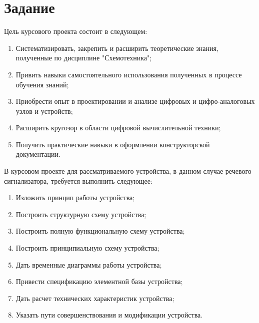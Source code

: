 \section{Задание}
Цель курсового проекта состоит в следующем: 
\begin{enumerate}
	\item Систематизировать, закрепить и расширить теоретические знания, полученные по дисциплине "Схемотехника"; 
	\item Привить навыки самостоятельного использования полученных в процессе обучения знаний; 
	\item Приобрести опыт в проектировании и анализе цифровых и цифро-аналоговых узлов и устройств; 
	\item Расширить кругозор в области цифровой вычислительной техники; 
	\item Получить практические навыки в оформлении конструкторской документации. 
\end{enumerate}

В курсовом проекте для рассматриваемого устройства, в данном случае речевого сигнализатора, требуется выполнить следующее: 

\begin{enumerate}
		\item Изложить принцип работы устройства; 
		\item Построить структурную схему устройства; 
		\item Построить полную функциональную схему устройства; 
		\item Построить принципиальную схему устройства; 
		\item Дать временные диаграммы работы устройства; 
		\item Привести спецификацию элементной базы устройства; 
		\item Дать расчет технических характеристик устройства; 
		\item Указать пути совершенствования и модификации устройства.
\end{enumerate}
	